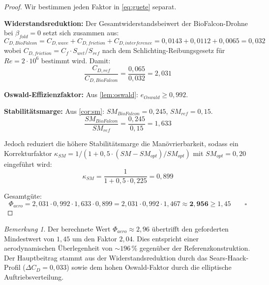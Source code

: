 ﻿\documentclass[12pt,a4paper]{article}
\theoremstyle{remark}
\newtheorem{bemerkung}{Bemerkung}[section]
\begin{document}
	\begin{proof}
		Wir bestimmen jeden Faktor in \cref{eq:guete} separat.
		
		\textbf{Widerstandsreduktion:}
		Der Gesamtwiderstandsbeiwert der BioFalcon-Drohne bei $\beta_{fold}=0$ setzt
		sich zusammen aus:
		\begin{equation}
			C_{D,BioFalcon} = C_{D,wave} + C_{D,friction} + C_{D,interference}
			= 0{,}0143 + 0{,}0112 + 0{,}0065 = 0{,}032
		\end{equation}
		wobei $C_{D,friction} = C_f \cdot S_{wet}/S_{ref}$ nach dem
		Schlichting-Reibungsgesetz für $Re = 2 \cdot 10^6$ bestimmt wird. Damit:
		\begin{equation}
			\frac{C_{D,ref}}{C_{D,BioFalcon}} = \frac{0{,}065}{0{,}032} = 2{,}031
		\end{equation}
		
		\textbf{Oswald-Effizienzfaktor:}
		Aus \cref{lem:oswald}: $e_{Oswald} \geq 0{,}992$.
		
		\textbf{Stabilitätsmarge:}
		Aus \cref{cor:sm}: $SM_{BioFalcon} = 0{,}245$, $SM_{ref} = 0{,}15$.
		\begin{equation}
			\frac{SM_{BioFalcon}}{SM_{ref}} = \frac{0{,}245}{0{,}15} = 1{,}633
		\end{equation}
		
		Jedoch reduziert die höhere Stabilitätsmarge die Manövrierbarkeit, sodass ein
		Korrekturfaktor $\kappa_{SM} = 1/(1 + 0{,}5 \cdot (SM - SM_{opt})/SM_{opt})$
		mit $SM_{opt} = 0{,}20$ eingeführt wird:
		\begin{equation}
			\kappa_{SM} = \frac{1}{1 + 0{,}5 \cdot 0{,}225} = 0{,}899
		\end{equation}
		
		Gesamtgüte:
		\begin{equation}
			\Phi_{aero} = 2{,}031 \cdot 0{,}992 \cdot 1{,}633 \cdot 0{,}899
			= 2{,}031 \cdot 0{,}992 \cdot 1{,}467
			\approx \mathbf{2{,}956} \geq 1{,}45 \qquad\square
		\end{equation}
	\end{proof}
	
	\begin{bemerkung}
		Der berechnete Wert $\Phi_{aero} \approx 2{,}96$ übertrifft den geforderten
		Mindestwert von $1{,}45$ um den Faktor $2{,}04$. Dies entspricht einer
		aerodynamischen Überlegenheit von $\sim\!196\,\%$ gegenüber der Referenzkonstruktion.
		Der Hauptbeitrag stammt aus der Widerstandsreduktion durch das Sears-Haack-Profil
		($\Delta C_D = 0{,}033$) sowie dem hohen Oswald-Faktor durch die elliptische
		Auftriebsverteilung.
	\end{bemerkung}
	
\end{document}

